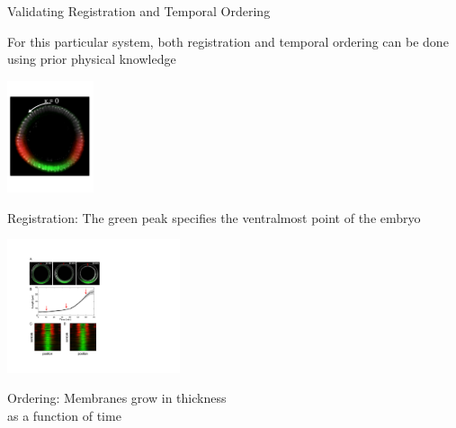 \documentclass[10pt]{beamer}
\begin{document}
\begin{frame}{Validating Registration and Temporal Ordering}

\centering
For this particular system, both registration and temporal ordering can be done using prior physical knowledge 

\vspace{0.1in}

\begin{minipage}{0.35\textwidth}
\begin{center}
\includegraphics[width=1in]{one_embryo}

{\small 
\textcolor{bold}{Registration:} The green peak specifies the ventralmost point of the embryo

\par}

\end{center}
\end{minipage}
\hfill
\begin{minipage}{0.6\textwidth}

\begin{center}
\includegraphics[width=2in, trim=0in 2.2in 0in 0in, clip]{fig6}

{\small 
\textcolor{bold}{Ordering:} 
Membranes grow in thickness \\as a function of time
\par}

\end{center}
\end{minipage}

\end{frame}
\end{document}
